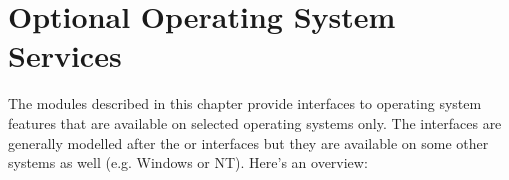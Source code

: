 \chapter{Optional Operating System Services}
\label{someos}

The modules described in this chapter provide interfaces to operating
system features that are available on selected operating systems only.
The interfaces are generally modelled after the \UNIX{} or \C{}
interfaces but they are available on some other systems as well
(e.g. Windows or NT).  Here's an overview:

\localmoduletable

